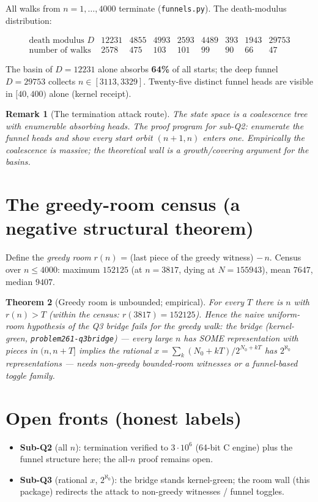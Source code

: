 \documentclass[11pt]{article}
\newtheorem{theorem}{Theorem}
\newtheorem{remark}[theorem]{Remark}
\begin{document}
All walks from $n = 1,\dots,4000$ terminate (\texttt{funnels.py}). The
death-modulus distribution:

\[
\begin{array}{l|rrrrrrrr}
\text{death modulus } D & 12231 & 4855 & 4993 & 2593 & 4489 & 393 & 1943 & 29753\\\hline
\text{number of walks} & 2578 & 475 & 103 & 101 & 99 & 90 & 66 & 47
\end{array}
\]

The basin of $D=12231$ alone absorbs \textbf{64\%} of all starts; the deep
funnel $D=29753$ collects $n\in[3113,3329]$. Twenty-five distinct funnel
heads are visible in $[40,400)$ alone (kernel receipt).

\begin{remark}[The termination attack route]
The state space is a coalescence tree with enumerable absorbing heads.
The proof program for sub-Q2: enumerate the funnel heads and show every
start orbit $(n+1,n)$ enters one. Empirically the coalescence is massive;
the theoretical wall is a growth/covering argument for the basins.
\end{remark}

\section{The greedy-room census (a negative structural theorem)}

Define the \emph{greedy room} $r(n)$ = (last piece of the greedy witness)
$-\,n$. Census over $n\le 4000$: maximum $152125$ (at $n=3817$, dying at
$N=155943$), mean $7647$, median $9407$.

\begin{theorem}[Greedy room is unbounded; empirical]
For every $T$ there is $n$ with $r(n)>T$ (within the census: $r(3817) =
152125$). Hence the naive uniform-room hypothesis of the Q3 bridge fails
for the greedy walk: the bridge (kernel-green,
\texttt{problem261-q3bridge}) --- every large $n$ has SOME representation
with pieces in $(n, n+T]$ implies the rational
$x=\sum_k (N_0+kT)/2^{N_0+kT}$ has $2^{\aleph_0}$ representations ---
needs non-greedy bounded-room witnesses or a funnel-based toggle family.
\end{theorem}

\section{Open fronts (honest labels)}

\begin{itemize}
\item \textbf{Sub-Q2} (all $n$): termination verified to $3\cdot 10^6$
(64-bit C engine) plus the funnel structure here; the all-$n$ proof
remains open.
\item \textbf{Sub-Q3} (rational $x$, $2^{\aleph_0}$): the bridge stands
kernel-green; the room wall (this package) redirects the attack to
non-greedy witnesses / funnel toggles.
\end{itemize}
\end{document}
